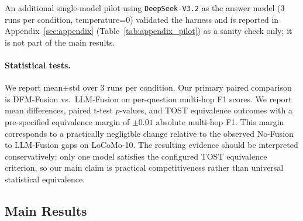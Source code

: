 An additional single-model pilot using \texttt{DeepSeek-V3.2} as the answer model (3 runs per condition, temperature=0) validated the harness and is reported in Appendix~\ref{sec:appendix} (Table~\ref{tab:appendix_pilot}) as a sanity check only; it is not part of the main results.

\paragraph{Statistical tests.}
We report mean$\pm$std over 3 runs per condition. Our primary paired comparison is DFM-Fusion vs.\ LLM-Fusion on per-question multi-hop F1 scores. We report mean differences, paired t-test $p$-values, and TOST equivalence outcomes with a pre-specified equivalence margin of $\pm 0.01$ absolute multi-hop F1. This margin corresponds to a practically negligible change relative to the observed No-Fusion to LLM-Fusion gaps on LoCoMo-10. The resulting evidence should be interpreted conservatively: only one model satisfies the configured TOST equivalence criterion, so our main claim is practical competitiveness rather than universal statistical equivalence.

\subsection{Main Results}

